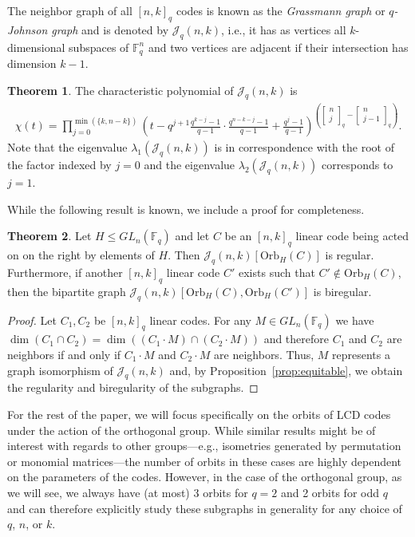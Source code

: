 \documentclass[11pt]{article}
\theoremstyle{definition}
\newtheorem{theorem}{Theorem}[section]
\newcommand{\F}{\mathbb{F}}
\newcommand{\Orb}{\mathrm{Orb}}
\newcommand{\Qbinom}[3]{{\begin{bmatrix} #1 \\ #2 \end{bmatrix}}_{#3}} %
\newcommand{\CurJ}{\mathcal{J}}
\newcommand{\Jq}{\CurJ}
\newcommand{\GL}{GL}
\begin{document}
The neighbor graph of all ${[n, k]}_q$ codes is known as the \emph{Grassmann graph} or \emph{$q$-Johnson graph} and is denoted by $\Jq_q(n, k)$, i.e., it has as vertices all $k$-dimensional subspaces of $\F_q^n$ and two vertices are adjacent if their intersection has dimension $k - 1$.

\begin{theorem}\cite[Theorem 9.3.3]{BCN89}\label{thm:Jq-char}
	The characteristic polynomial of $\Jq_q(n, k)$ is
	\begin{align*}
		\chi(t)
		= \prod_{j = 0}^{\min(\{k, n - k\})}
		{\left(
			t - q^{j + 1} \frac{q^{k - j} - 1}{q - 1} \cdot \frac{q^{n - k - j} - 1}{q - 1} + \frac{q^j - 1}{q - 1} \right)}^{\left( \Qbinom{n}{j}{q} - \Qbinom{n}{j - 1}{q} \right)}.
	\end{align*}
	Note that the eigenvalue $\lambda_1(\Jq_q(n, k))$ is in correspondence with the root of the factor indexed by $j = 0$ and the eigenvalue $\lambda_2(\Jq_q(n, k))$ corresponds to $j = 1$.
\end{theorem}

While the following result is known, we include a proof for completeness.

\begin{theorem}\label{thm:biregular}
	Let $H \leq \GL_n(\F_q)$ and let $C$ be an ${[n, k]}_q$ linear code being acted on on the right by elements of $H$.
	Then $\Jq_q(n, k)[\Orb_H(C)]$ is regular.
	Furthermore, if another ${[n, k]}_q$ linear code $C'$ exists such that $C' \notin \Orb_H(C)$, then the bipartite graph $\Jq_q(n, k)[\Orb_H(C), \Orb_H(C')]$ is biregular.
\end{theorem}

\begin{proof}
Let $C_1,C_2$ be ${[n, k]}_q$ linear codes.
	For any $M\in \GL_n(\F_q)$ we have $\dim(C_1 \cap C_2) = \dim((C_1 \cdot M) \cap (C_2 \cdot M))$ and therefore $C_1$ and $C_2$ are neighbors if and only if $C_1 \cdot M$ and $C_2 \cdot M$ are neighbors.
	Thus, $M$ represents a graph isomorphism of $\Jq_q(n, k)$ and, by Proposition~\ref{prop:equitable}, we obtain the regularity and biregularity of the subgraphs.
\end{proof}

For the rest of the paper, we will focus specifically on the orbits of LCD codes under the action of the orthogonal group.
While similar results might be of interest with regards to other groups---e.g., isometries generated by permutation or monomial matrices---the number of orbits in these cases are highly dependent on the parameters of the codes.
However, in the case of the orthogonal group, as we will see, we always have (at most) 3 orbits for $q = 2$ and 2 orbits for odd $q$ and can therefore explicitly study these subgraphs in generality for any choice of $q$, $n$, or $k$.
\end{document}
